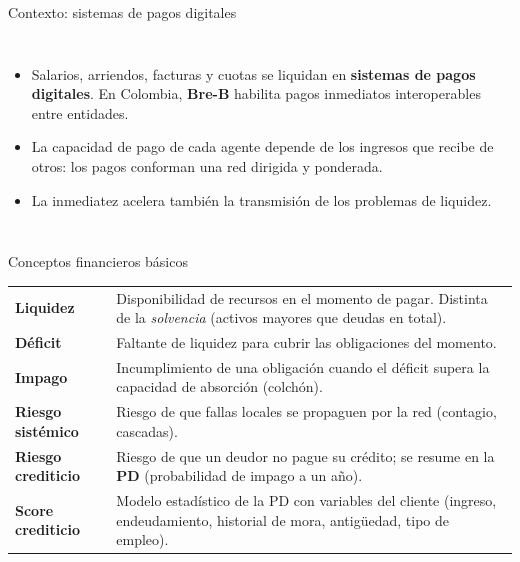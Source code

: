 \documentclass[aspectratio=169,10pt]{beamer}
\begin{document}
\begin{frame}{Contexto: sistemas de pagos digitales}
\begin{columns}[T]
\begin{itemize}
\item Salarios, arriendos, facturas y cuotas se liquidan en \textbf{sistemas de pagos
digitales}. En Colombia, \textbf{Bre-B} habilita pagos inmediatos interoperables entre
entidades.
\item La capacidad de pago de cada agente depende de los ingresos que recibe de otros:
los pagos conforman una \alert{red dirigida y ponderada}.
\item La inmediatez acelera también la transmisión de los problemas de liquidez.
\end{itemize}
\centering
{}
\end{columns}
\end{frame}

\begin{frame}{Conceptos financieros básicos}
\small
\begin{tabular}{p{}p{}}
\toprule
\textbf{Liquidez} & Disponibilidad de recursos en el momento de pagar. Distinta de la
\emph{solvencia} (activos mayores que deudas en total). \\
\textbf{Déficit} & Faltante de liquidez para cubrir las obligaciones del momento. \\
\textbf{Impago} & Incumplimiento de una obligación cuando el déficit supera la capacidad
de absorción (colchón). \\
\textbf{Riesgo sistémico} & Riesgo de que fallas locales se propaguen por la red
(contagio, cascadas). \\
\textbf{Riesgo crediticio} & Riesgo de que un deudor no pague su crédito; se resume en
la \textbf{PD} (probabilidad de impago a un año). \\
\textbf{Score crediticio} & Modelo estadístico de la PD con variables del cliente
(ingreso, endeudamiento, historial de mora, antigüedad, tipo de empleo). \\
\bottomrule
\end{tabular}
\end{frame}
\end{document}
